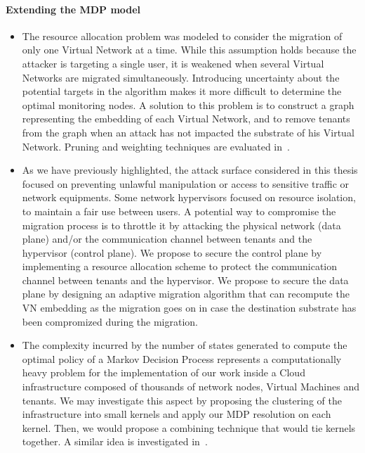 \paragraph{Extending the MDP model}
\begin{itemize}
    \item 
    The resource allocation problem was modeled to consider the migration of only one Virtual Network at a time. While this assumption holds because the attacker is targeting a single user, it is weakened when several Virtual Networks are migrated simultaneously. Introducing uncertainty about the potential targets in the algorithm makes it more difficult to determine the optimal monitoring nodes. A solution to this problem is to construct a graph representing the embedding of each Virtual Network, and to remove tenants from the graph when an attack has not impacted the substrate of his Virtual Network. Pruning and weighting techniques are evaluated in~\cite{pruning-secu}.

    \item 
    As we have previously highlighted, the attack surface considered in this thesis focused on preventing unlawful manipulation or access to sensitive traffic or network equipments. Some network hypervisors focused on resource isolation, to maintain a fair use between users. A potential way to compromise the migration process is to throttle it by attacking the physical network (data plane) and/or the communication channel between tenants and the hypervisor (control plane). We propose to secure the control plane by implementing a resource allocation scheme to protect the communication channel between tenants and the hypervisor. We propose to secure the data plane by designing an adaptive migration algorithm that can recompute the VN embedding as the migration goes on in case the destination substrate has been compromized during the migration. 

    \item 
    The complexity incurred by the number of states generated to compute the optimal policy of a Markov Decision Process represents a computationally heavy problem for the implementation of our work inside a Cloud infrastructure composed of thousands of network nodes, Virtual Machines and tenants. We may investigate this aspect by proposing the clustering of the infrastructure into small kernels and apply our MDP resolution on each kernel. Then, we would propose a combining technique that would tie kernels together. A similar idea is investigated in~\cite{POMDP-clustering}.


\end{itemize}
